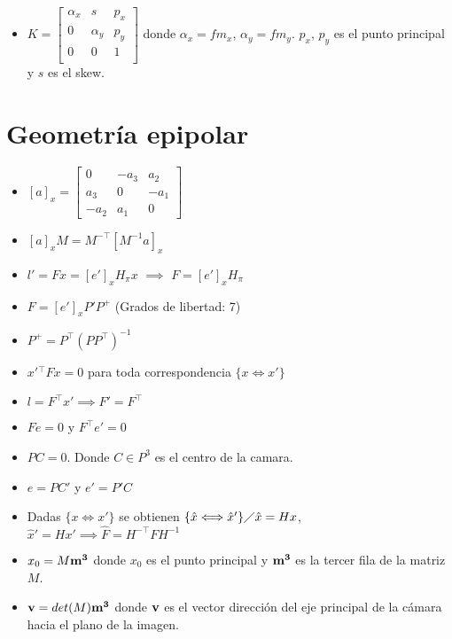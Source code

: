 \documentclass[12pt,a4paper]{article}
\begin{document}
\begin{itemize}
	\item $
	K = \left[ {\begin{smallmatrix}
		\alpha_{x} & s & p_{x}\\ 
	    0 & \alpha_{y} & p_{y}\\
	    0 & 0 & 1\\
	\end{smallmatrix} } \right]
	$ donde $\alpha_{x} = f m_{x}$, $\alpha_{y} = f m_{y}$. $p_{x}$, $p_{y}$ es el punto principal y $s$ es el skew.

\end{itemize}


\section{Geometr\'ia epipolar}

\begin{itemize}
	\item $[a]_{x} = \left[ {\begin{smallmatrix}
		0 & -a_3 & a_2\\ 
		a_3  & 0 & -a_1\\
		-a_2 & a_1 & 0
		\end{smallmatrix} } \right] $

	\item $[a]_{x}M = M^{-\top}[M^{-1}a]_{x}$

	\item $l' = Fx = [e']_{x} H_{\pi} x$ $\implies$ $F = [e']_{x} H_{\pi}$

	\item $F = [e']_{x} P' P^{+}$   \hspace*{1cm}(Grados de libertad: 7)

	\item $P^{+} = P^{\top}(PP^{\top})^{-1}$

	\item ${x'}{}^{\top}Fx =0$ para toda correspondencia $\{x \Longleftrightarrow x' \}$

	\item $l = F^{\top}x' \implies F' = F^{\top}$

	\item $Fe = 0$ y $F^{\top}e' = 0$

	\item $PC = 0$. Donde $C \in P^{3}$ es el centro de la camara.

	\item $e = PC'$ y $e' = P'C$

	\item Dadas $\{x \Longleftrightarrow x' \}$ se obtienen  $\{\hat{x} \Longleftrightarrow \hat{x}' \} \diagup \hat{x} = Hx$, $\hat{x}'=Hx'  \implies \hat{F} = H^{-\top}FH^{-1}$
	
	\item $x_{0} = M{\bf m^{3}}$ donde $x_{0}$ es el punto principal y ${\bf m^{3}}$ es la tercer fila de la matriz $M$.
	
	\item ${\bf v}= det(M){\bf m^{3}}$ donde ${\bf v}$ es el vector direcci\'on del eje principal de la c\'amara hacia el plano de la imagen.

\end{itemize}
\end{document}

